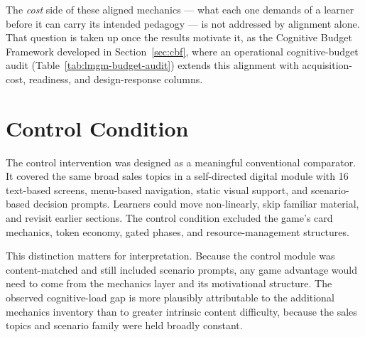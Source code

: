 \documentclass[12pt]{report}
\begin{document}
The \emph{cost} side of these aligned mechanics --- what each one demands of a learner before it can carry its intended pedagogy --- is not addressed by alignment alone. That question is taken up once the results motivate it, as the Cognitive Budget Framework developed in Section~\ref{sec:cbf}, where an operational cognitive-budget audit (Table~\ref{tab:lmgm-budget-audit}) extends this alignment with acquisition-cost, readiness, and design-response columns.

\section{Control Condition}
The control intervention was designed as a meaningful conventional comparator. It covered the same broad sales topics in a self-directed digital module with 16 text-based screens, menu-based navigation, static visual support, and scenario-based decision prompts. Learners could move non-linearly, skip familiar material, and revisit earlier sections. The control condition excluded the game's card mechanics, token economy, gated phases, and resource-management structures.

This distinction matters for interpretation. Because the control module was content-matched and still included scenario prompts, any game advantage would need to come from the mechanics layer and its motivational structure. The observed cognitive-load gap is more plausibly attributable to the additional mechanics inventory than to greater intrinsic content difficulty, because the sales topics and scenario family were held broadly constant.
\end{document}
